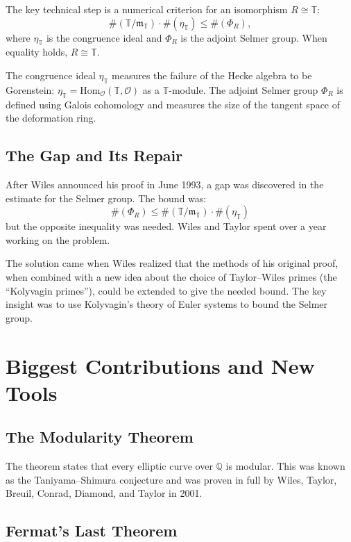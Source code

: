 The key technical step is a numerical criterion for an isomorphism $R \cong \mathbb{T}$:
\[
\#(\mathbb{T}/\mathfrak{m}_\mathbb{T}) \cdot \#(\eta_\mathbb{T}) \leq \#(\Phi_R),
\]
where $\eta_\mathbb{T}$ is the congruence ideal and $\Phi_R$ is the adjoint Selmer group. When equality holds, $R \cong \mathbb{T}$.

The congruence ideal $\eta_\mathbb{T}$ measures the failure of the Hecke algebra to be Gorenstein: $\eta_\mathbb{T} = \mathrm{Hom}_{\mathcal{O}}(\mathbb{T}, \mathcal{O})$ as a $\mathbb{T}$-module. The adjoint Selmer group $\Phi_R$ is defined using Galois cohomology and measures the size of the tangent space of the deformation ring.

\subsection{The Gap and Its Repair}

After Wiles announced his proof in June 1993, a gap was discovered in the estimate for the Selmer group. The bound was:
\[
\#(\Phi_R) \leq \#(\mathbb{T}/\mathfrak{m}_\mathbb{T}) \cdot \#(\eta_\mathbb{T})
\]
but the opposite inequality was needed. Wiles and Taylor spent over a year working on the problem.

The solution came when Wiles realized that the methods of his original proof, when combined with a new idea about the choice of Taylor--Wiles primes (the ``Kolyvagin primes''), could be extended to give the needed bound. The key insight was to use Kolyvagin's theory of Euler systems to bound the Selmer group.

\section{Biggest Contributions and New Tools}

\subsection{The Modularity Theorem}

The theorem states that every elliptic curve over $\mathbb{Q}$ is modular. This was known as the Taniyama--Shimura conjecture and was proven in full by Wiles, Taylor, Breuil, Conrad, Diamond, and Taylor in 2001.

\subsection{Fermat's Last Theorem}

